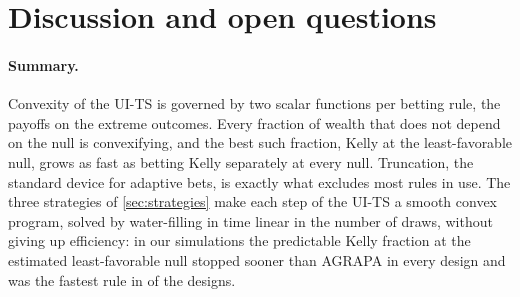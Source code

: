 \documentclass[11pt]{article}
\theoremstyle{plain}
\theoremstyle{definition}
\theoremstyle{remark}
\begin{document}
\section{Discussion and open questions}\label{sec:discussion}

\paragraph{Summary.}  Convexity of the UI-TS is governed by two scalar functions per betting rule, the payoffs on the
extreme outcomes.  Every fraction of wealth that does not depend on the null is convexifying, and the best such
fraction, Kelly at the least-favorable null, grows as fast as betting Kelly separately at every null.  Truncation, the
standard device for adaptive bets, is exactly what excludes most rules in use.  The three strategies of
\cref{sec:strategies} make each step of the UI-TS a smooth convex program, solved by water-filling in time linear in
the number of draws, without giving up efficiency: in our simulations the predictable Kelly fraction at the estimated
least-favorable null stopped sooner than AGRAPA in every design and was the fastest rule in \fsonebest{} of the
\fndesigns{} designs.
\end{document}
